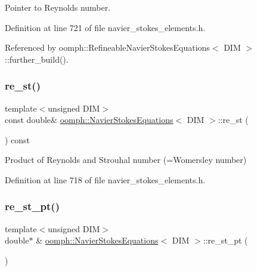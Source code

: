 Pointer to Reynolds number. 



Definition at line 721 of file navier\+\_\+stokes\+\_\+elements.\+h.



Referenced by oomph\+::\+Refineable\+Navier\+Stokes\+Equations$<$ D\+I\+M $>$\+::further\+\_\+build().

\mbox{\label{classoomph_1_1NavierStokesEquations_a88344305ac612db40cecc6701f094c88}} 
\subsubsection{\texorpdfstring{re\+\_\+st()}{re\_st()}}
{\footnotesize\ttfamily template$<$unsigned D\+IM$>$ \\
const double\& \hyperlink{classoomph_1_1NavierStokesEquations}{oomph\+::\+Navier\+Stokes\+Equations}$<$ D\+IM $>$\+::re\+\_\+st (\begin{DoxyParamCaption}{ }\end{DoxyParamCaption}) const\hspace{0.3cm}{\ttfamily [inline]}}



Product of Reynolds and Strouhal number (=Womersley number) 



Definition at line 718 of file navier\+\_\+stokes\+\_\+elements.\+h.

\mbox{\label{classoomph_1_1NavierStokesEquations_a947047c42ccb56e2ecff71357267b98d}} 
\subsubsection{\texorpdfstring{re\+\_\+st\+\_\+pt()}{re\_st\_pt()}}
{\footnotesize\ttfamily template$<$unsigned D\+IM$>$ \\
double$\ast$ \& \hyperlink{classoomph_1_1NavierStokesEquations}{oomph\+::\+Navier\+Stokes\+Equations}$<$ D\+IM $>$\+::re\+\_\+st\+\_\+pt (\begin{DoxyParamCaption}{ }\end{DoxyParamCaption})\hspace{0.3cm}{\ttfamily [inline]}}



